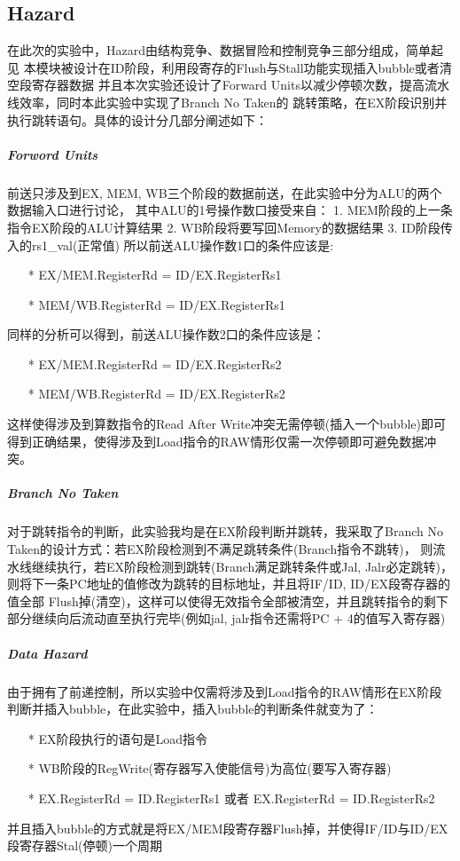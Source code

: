 \subsection{Hazard}
在此次的实验中，Hazard由结构竞争、数据冒险和控制竞争三部分组成，简单起见
本模块被设计在ID阶段，利用段寄存的Flush与Stall功能实现插入bubble或者清空段寄存器数据
并且本次实验还设计了Forward Units以减少停顿次数，提高流水线效率，同时本此实验中实现了Branch No Taken的
跳转策略，在EX阶段识别并执行跳转语句。具体的设计分几部分阐述如下：

\subparagraph{Forword Units}
前送只涉及到EX, MEM, WB三个阶段的数据前送，在此实验中分为ALU的两个数据输入口进行讨论，
其中ALU的1号操作数口接受来自：
1. MEM阶段的上一条指令EX阶段的ALU计算结果
2. WB阶段将要写回Memory的数据结果
3. ID阶段传入的rs1\_val(正常值)
所以前送ALU操作数1口的条件应该是:
\begin{itemize}
    \item [*] EX/MEM.RegisterRd = ID/EX.RegisterRs1
    \item [*] MEM/WB.RegisterRd = ID/EX.RegisterRs1
\end{itemize}
同样的分析可以得到，前送ALU操作数2口的条件应该是：
\begin{itemize}
    \item [*] EX/MEM.RegisterRd = ID/EX.RegisterRs2
    \item [*] MEM/WB.RegisterRd = ID/EX.RegisterRs2
\end{itemize}
这样使得涉及到算数指令的Read After Write冲突无需停顿(插入一个bubble)即可得到正确结果，使得涉及到Load指令的RAW情形仅需一次停顿即可避免数据冲突。

\subparagraph{Branch No Taken}
对于跳转指令的判断，此实验我均是在EX阶段判断并跳转，我采取了Branch No Taken的设计方式：若EX阶段检测到不满足跳转条件(Branch指令不跳转)，
则流水线继续执行，若EX阶段检测到跳转(Branch满足跳转条件或Jal, Jalr必定跳转)，则将下一条PC地址的值修改为跳转的目标地址，并且将IF/ID, ID/EX段寄存器的值全部
Flush掉(清空)，这样可以使得无效指令全部被清空，并且跳转指令的剩下部分继续向后流动直至执行完毕(例如jal, jalr指令还需将PC + 4的值写入寄存器)

\subparagraph{Data Hazard}
由于拥有了前递控制，所以实验中仅需将涉及到Load指令的RAW情形在EX阶段判断并插入bubble，在此实验中，插入bubble的判断条件就变为了：
\begin{itemize}
    \item [*] EX阶段执行的语句是Load指令
    \item [*] WB阶段的RegWrite(寄存器写入使能信号)为高位(要写入寄存器)
    \item [*] EX.RegisterRd = ID.RegisterRs1 或者 EX.RegisterRd = ID.RegisterRs2
\end{itemize}
并且插入bubble的方式就是将EX/MEM段寄存器Flush掉，并使得IF/ID与ID/EX段寄存器Stal(停顿)一个周期
